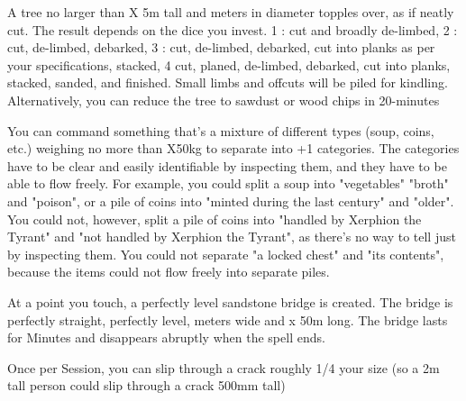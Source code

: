 {A tree no larger than \DICE X 5m tall and \DICE meters in diameter topples over, as if neatly cut. The result depends on the dice you invest. 1 \DICE: cut and broadly de-limbed, 2 \DICE: cut, de-limbed, debarked, 3 \DICE: cut, de-limbed, debarked, cut into planks as per your specifications, stacked, 4 \DICE cut, planed, de-limbed, debarked, cut into planks, stacked, sanded, and finished. Small limbs and offcuts will be piled for kindling. Alternatively, you can reduce the tree to sawdust or wood chips in 20-\SUMDICE minutes

\LITURGY [
  Name= Ptah's Compartmentalization,
  Link=ptah-liturgy-ptahs-compartmentalization,
  Paradigm= Entropy ,
  Save=  0 ,
  Duration= permanent ,
  Counter=  n/a  ,
  Keywords= None ,
  Target=   Close object
]



You can command something that's a mixture of different types (soup, coins, etc.) weighing no more than \DICE X50kg to separate into \DICE+1 categories.  The categories have to be clear and easily identifiable by inspecting them, and they have to be able to flow freely.  For example, you could split a soup into "vegetables" "broth" and "poison", or a pile of coins into "minted during the last century" and "older". You could not, however, split a pile of coins into "handled by Xerphion the Tyrant" and "not handled by Xerphion the Tyrant", as there's no way to tell just by inspecting them. You could not separate "a locked chest" and "its contents", because the items could not flow freely into separate piles.

\LITURGY [
  Name= Sandstone Bridge,
  Link=ptah-liturgy-sandstone-bridge,
  Paradigm= Entropy ,
  Save=  0 ,
  Duration= \SUMDICE Minutes ,
  Counter=  n/a  ,
  Keywords= None ,
  Target=   Close point
]



At a point you touch, a perfectly level sandstone bridge is created.  The bridge is perfectly straight, perfectly level, \DICE meters wide and \DICE x 50m long.  The bridge lasts for \SUMDICE Minutes and disappears abruptly when the spell ends.



\GOD[
Name=The Rat God,
Link=small-god-the rat god,
GodOf=Prince of Rats and Vermin,
Holy=a mouse-skin glove worn on the dominant hand
]


Once per Session, you can slip through a crack roughly 1/4 your size (so a 2m tall person could slip through a crack 500mm tall)

}
